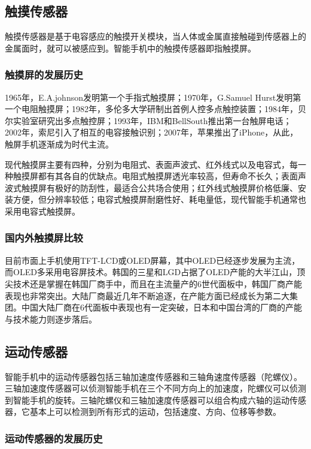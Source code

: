 \documentclass[lang=cn]{elegantpaper}
\begin{document}
\subsection{触摸传感器}

触摸传感器是基于电容感应的触摸开关模块，当人体或金属直接触碰到传感器上的金属面时，就可以被感应到。智能手机中的触摸传感器即指触摸屏。

\subsubsection{触摸屏的发展历史}

1965年，E.A.johnson发明第一个手指式触摸屏；1970年，G.Samuel Hurst发明第一个电阻触摸屏；1982年，多伦多大学研制出首例人控多点触控装置；1984年，贝尔实验室研究出多点触控屏；1993年，IBM和BellSouth推出第一台触屏电话；2002年，索尼引入了相互的电容接触识别；2007年，苹果推出了iPhone，从此，触屏手机逐渐成为时代主流。

现代触摸屏主要有四种，分别为电阻式、表面声波式、红外线式以及电容式\cite{touchScreenClassify}，每一种触摸屏都有其各自的优缺点。电阻式触摸屏透光率较高，但寿命不长久；表面声波式触摸屏有极好的防刮性，最适合公共场合使用；红外线式触摸屏价格低廉、安装方便，但分辨率较低；电容式触摸屏耐磨性好、耗电量低，现代智能手机通常也采用电容式触摸屏。

\subsubsection{国内外触摸屏比较}

目前市面上手机使用TFT-LCD或OLED屏幕，其中OLED已经逐步发展为主流，而OLED多采用电容屏技术。韩国的三星和LGD占据了OLED产能的大半江山，顶尖技术还是掌握在韩国厂商手中，而且在主流量产的6世代面板中，韩国厂商产能表现也非常突出。大陆厂商最近几年不断追逐，在产能方面已经成长为第二大集团。中国大陆厂商在6代面板中表现也有一定突破，日本和中国台湾的厂商的产能与技术能力则逐步落后。


\subsection{运动传感器}

智能手机中的运动传感器包括三轴加速度传感器和三轴角速度传感器（陀螺仪）。三轴加速度传感器可以侦测智能手机在三个不同方向上的加速度，陀螺仪可以侦测到智能手机的旋转。三轴陀螺仪和三轴加速度传感器可以组合构成六轴的运动传感器，它基本上可以检测到所有形式的运动，包括速度、方向、位移等参数。

\subsubsection{运动传感器的发展历史}
\end{document}
